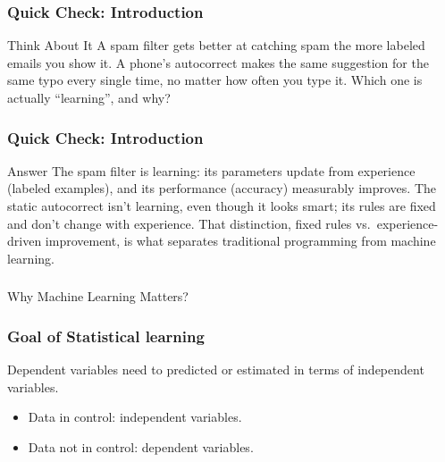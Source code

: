 
\begin{frame}[fragile]\frametitle{Quick Check: Introduction}
\begin{block}{Think About It}
A spam filter gets better at catching spam the more labeled emails you show it. A phone's autocorrect makes the same suggestion for the same typo every single time, no matter how often you type it. Which one is actually ``learning'', and why?
\end{block}
\end{frame}

\begin{frame}[fragile]\frametitle{Quick Check: Introduction}
\begin{block}{Answer}
The spam filter is learning: its parameters update from experience (labeled examples), and its performance (accuracy) measurably improves. The static autocorrect isn't learning, even though it looks smart; its rules are fixed and don't change with experience. That distinction, fixed rules vs.\ experience-driven improvement, is what separates traditional programming from machine learning.
\end{block}
\end{frame}

\begin{frame}[fragile]\frametitle{}
\begin{center}
{\Large Why Machine Learning Matters?}
\end{center}
\end{frame}


\begin{frame}[fragile]\frametitle{Goal of Statistical learning}
Dependent variables need to predicted or estimated in terms of independent variables.

	\begin{itemize}
	\item Data in control: independent variables.
	\item Data not in control: dependent variables.
	\end{itemize}
\end{frame}


